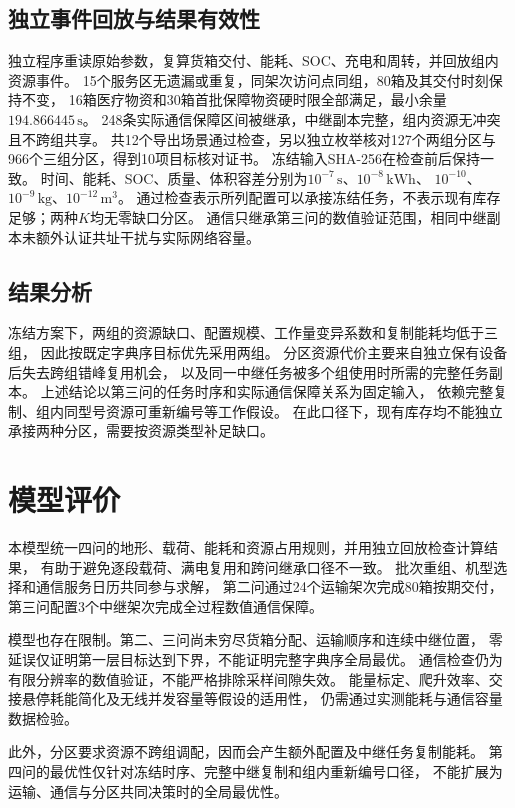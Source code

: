 \documentclass[bwprint]{gmcmthesis}
\begin{document}
\subsection{独立事件回放与结果有效性}
独立程序重读原始参数，复算货箱交付、能耗、SOC、充电和周转，并回放组内资源事件。
15个服务区无遗漏或重复，同架次访问点同组，80箱及其交付时刻保持不变，
16箱医疗物资和30箱首批保障物资硬时限全部满足，最小余量$194.866445\,\mathrm{s}$。
248条实际通信保障区间被继承，中继副本完整，组内资源无冲突且不跨组共享。
共12个导出场景通过检查，另以独立枚举核对127个两组分区与966个三组分区，得到10项目标核对证书。
冻结输入SHA-256在检查前后保持一致。
时间、能耗、SOC、质量、体积容差分别为$10^{-7}\,\mathrm{s}$、$10^{-8}\,\mathrm{kWh}$、
$10^{-10}$、$10^{-9}\,\mathrm{kg}$、$10^{-12}\,\mathrm{m^3}$。
通过检查表示所列配置可以承接冻结任务，不表示现有库存足够；两种$K$均无零缺口分区。
通信只继承第三问的数值验证范围，相同中继副本未额外认证共址干扰与实际网络容量。

\subsection{结果分析}
冻结方案下，两组的资源缺口、配置规模、工作量变异系数和复制能耗均低于三组，
因此按既定字典序目标优先采用两组。
分区资源代价主要来自独立保有设备后失去跨组错峰复用机会，
以及同一中继任务被多个组使用时所需的完整任务副本。
上述结论以第三问的任务时序和实际通信保障关系为固定输入，
依赖完整复制、组内同型号资源可重新编号等工作假设。
在此口径下，现有库存均不能独立承接两种分区，需要按资源类型补足缺口。

\section{模型评价}

本模型统一四问的地形、载荷、能耗和资源占用规则，并用独立回放检查计算结果，
有助于避免逐段载荷、满电复用和跨问继承口径不一致。
批次重组、机型选择和通信服务日历共同参与求解，
第二问通过24个运输架次完成80箱按期交付，
第三问配置3个中继架次完成全过程数值通信保障。

模型也存在限制。第二、三问尚未穷尽货箱分配、运输顺序和连续中继位置，
零延误仅证明第一层目标达到下界，不能证明完整字典序全局最优。
通信检查仍为有限分辨率的数值验证，不能严格排除采样间隙失效。
能量标定、爬升效率、交接悬停耗能简化及无线并发容量等假设的适用性，
仍需通过实测能耗与通信容量数据检验。

此外，分区要求资源不跨组调配，因而会产生额外配置及中继任务复制能耗。
第四问的最优性仅针对冻结时序、完整中继复制和组内重新编号口径，
不能扩展为运输、通信与分区共同决策时的全局最优性。
\end{document}
